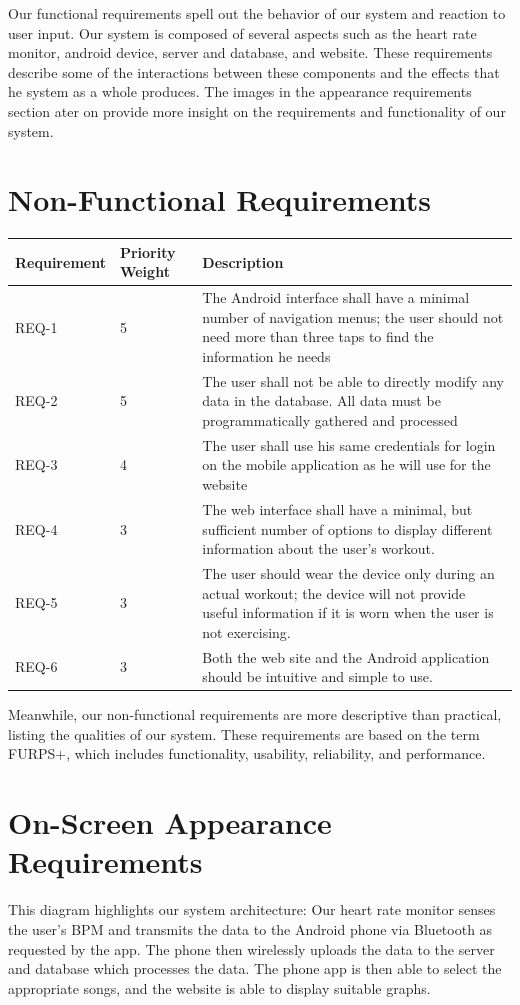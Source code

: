 \documentclass[letterpaper,english]{scrreprt}
\begin{document}
Our functional requirements spell out the behavior of our system and reaction to
user input. Our system is composed of several aspects such as the heart rate
monitor, android device, server and database, and website. These requirements
describe some of the interactions between these components and the effects that
he system as a whole produces. The images in the appearance requirements section
ater on provide more insight on the requirements and functionality of our system.

\section{Non-Functional Requirements}
\begin{center}
	\begin{tabular}{|C{2cm}|C{2cm}|C{8cm}|}
		\hline
			Requirement & Priority Weight & Description \\
		\hline
			REQ-1 & 5 & The Android interface shall have a minimal number of navigation menus; the user should not need more than three taps to find the information he needs \\
		\hline
			REQ-2 & 5 & The user shall not be able to directly modify any data in the database. All data must be programmatically gathered and processed \\
		\hline
			REQ-3 & 4 & The user shall use his same credentials for login on the mobile application as he will use for the website \\
		\hline
			REQ-4 & 3 & The web interface shall have a minimal, but sufficient number of options to display different information about the user's workout. \\
		\hline
			REQ-5 & 3 & The user should wear the device only during an actual workout; the device will not provide useful information if it is worn when the user is not exercising. \\
		\hline	
			REQ-6 & 3 & Both the web site and the Android application should be intuitive and simple to use. \\
		\hline
	\end{tabular}
\end{center}

Meanwhile, our non-functional requirements are more descriptive than practical,
listing the qualities of our system. These requirements are based on the term
FURPS+, which includes functionality, usability, reliability, and performance.

\section{On-Screen Appearance Requirements}
This diagram highlights our system architecture: Our heart rate monitor senses the
user’s BPM and transmits the data to the Android phone via Bluetooth as requested
by the app. The phone then wirelessly uploads the data to the server and database
which processes the data. The phone app is then able to select the appropriate
songs, and the website is able to display suitable graphs.
\end{document}

